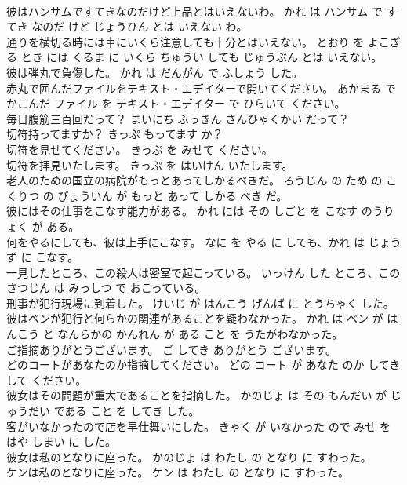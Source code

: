 \documentclass[8pt]{extreport}
\begin{document}
\begin{CJK}{UTF8}{min}
\\	彼はハンサムですてきなのだけど上品とはいえないわ。	かれ は ハンサム で すてき なのだ けど じょうひん とは いえない わ。	
\\	通りを横切る時には車にいくら注意しても十分とはいえない。	とおり を よこぎる とき には くるま に いくら ちゅうい しても じゅうぶん とは いえない。	
\\	彼は弾丸で負傷した。	かれ は だんがん で ふしょう した。	
\\	赤丸で囲んだファイルをテキスト・エデイターで開いてください。	あかまる で かこんだ ファイル を テキスト・エデイター で ひらいて ください。	
\\	毎日腹筋三百回だって？	まいにち ふっきん さんひゃくかい だって？	
\\	切符持ってますか？	きっぷ もってます か？	
\\	切符を見せてください。	きっぷ を みせて ください。	
\\	切符を拝見いたします。	きっぷ を はいけん いたします。	
\\	老人のための国立の病院がもっとあってしかるべきだ。	ろうじん の ため の こくりつ の びょういん が もっと あって しかる べき だ。	
\\	彼にはその仕事をこなす能力がある。	かれ には その しごと を こなす のうりょく が ある。	
\\	何をやるにしても、彼は上手にこなす。	なに を やる に しても、かれ は じょうず に こなす。	
\\	一見したところ、この殺人は密室で起こっている。	いっけん した ところ、この さつじん は みっしつ で おこっている。	
\\	刑事が犯行現場に到着した。	けいじ が はんこう げんば に とうちゃく した。	
\\	彼はベンが犯行と何らかの関連があることを疑わなかった。	かれ は ベン が はんこう と なんらかの かんれん が ある こと を うたがわなかった。	
\\	ご指摘ありがとうございます。	ご してき ありがとう ございます。	
\\	どのコートがあなたのか指摘してください。	どの コート が あなた のか してき して ください。	
\\	彼女はその問題が重大であることを指摘した。	かのじょ は その もんだい が じゅうだい である こと を してき した。	
\\	客がいなかったので店を早仕舞いにした。	きゃく が いなかった ので みせ を はや しまい に した。	
\\	彼女は私のとなりに座った。	かのじょ は わたし の となり に すわった。	
\\	ケンは私のとなりに座った。	ケン は わたし の となり に すわった。	

\end{CJK}
\end{document}
